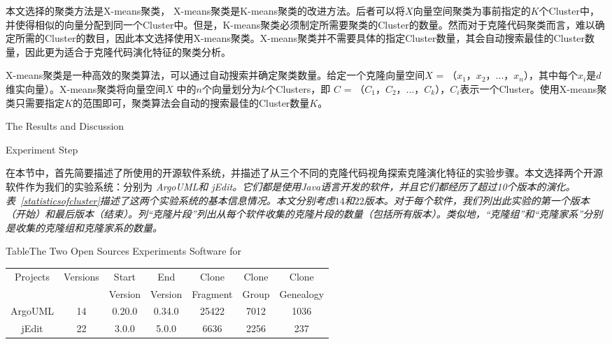 本文选择的聚类方法是X-means聚类\cite{pelleg2000x}， X-means聚类是K-means聚类\cite{arthur2007k}的改进方法。后者可以将$X$向量空间聚类为事前指定的$K$个Cluster中，并使得相似的向量分配到同一个Cluster中。但是，K-means聚类必须制定所需要聚类的Cluster的数量。然而对于克隆代码聚类而言，难以确定所需的Cluster的数目，因此本文选择使用X-means聚类。X-means聚类并不需要具体的指定Cluster数量，其会自动搜索最佳的Cluster数量，因此更为适合于克隆代码演化特征的聚类分析。

X-means聚类是一种高效的聚类算法，可以通过自动搜索并确定聚类数量\cite{pelleg2000x}。给定一个克隆向量空间$X$ = {（$x_1$，$x_2$，$...$，$x_n$）}，其中每个$x_i$是$d$维实向量）。X-means聚类将向量空间$X$ 中的$n$个向量划分为$k$个Clusters，即 $C$ = {（$C_1$，$C_2$，$...$，$C_k$）}，$C_i$表示一个Cluster。使用X-means聚类只需要指定$K$的范围即可，聚类算法会自动的搜索最佳的Cluster数量$K$。

{The Results and Discussion}

{Experiment Step}

在本节中，首先简要描述了所使用的开源软件系统，并描述了从三个不同的克隆代码视角探索克隆演化特征的实验步骤。本文选择两个开源软件作为我们的实验系统：分别为\em{ ArgoUML}和\em{  jEdit}。它们都是使用Java语言开发的软件，并且它们都经历了超过10个版本的演化。%
表~\ref{statisticsofcluster}描述了这两个实验系统的基本信息情况。本文分别考虑$14 $和$22$版本。对于每个软件，我们列出此实验的第一个版本（开始）和最后版本（结束）。列“克隆片段”列出从每个软件收集的克隆片段的数量（包括所有版本）。类似地，“克隆组”和“克隆家系”分别是收集的克隆组和克隆家系的数量。

\begin{table}[htbp]
{Table$\!$}{The Two Open Sources Experiments Software for }
\vspace{0.5em}
\centering 
\wuhao
\begin{tabular}{ccccccc}
\toprule[1.5pt ]
\multirow{2}{*}{Projects}&\multirow{2}{*}{Versions}&Start&End&Clone&Clone&Clone\\ 
&&Version&Version&Fragment&Group&Genealogy\\
\midrule[1pt]
ArgoUML&14&0.20.0&0.34.0&25422&7012&1036\\ 
jEdit&22&3.0.0&5.0.0&6636&2256	&237\\ 
\bottomrule[1.5pt]
\end{tabular}
\end{table}

